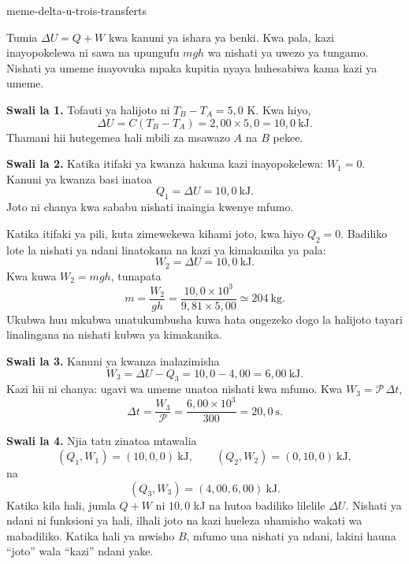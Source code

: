 \begin{exo}{meme-delta-u-trois-transferts}
\begin{indication}
Tumia $\Delta U=Q+W$ kwa kanuni ya ishara ya benki. Kwa pala, kazi inayopokelewa
ni sawa na upungufu $mgh$ wa nishati ya uwezo ya tungamo. Nishati ya umeme
inayovuka mpaka kupitia nyaya huhesabiwa kama kazi ya umeme.
\end{indication}

\begin{solution}
\textbf{Swali la 1.} Tofauti ya halijoto ni $T_B-T_A=5{,}0$ K. Kwa hiyo,
\[
\Delta U=C(T_B-T_A)
=2{,}00\times5{,}0
=10{,}0\ \mathrm{kJ}.
\]
Thamani hii hutegemea hali mbili za msawazo $A$ na $B$ pekee.

\textbf{Swali la 2.} Katika itifaki ya kwanza hakuna kazi inayopokelewa:
$W_1=0$. Kanuni ya kwanza basi inatoa
\[
Q_1=\Delta U=10{,}0\ \mathrm{kJ}.
\]
Joto ni chanya kwa sababu nishati inaingia kwenye mfumo.

Katika itifaki ya pili, kuta zimewekewa kihami joto, kwa hiyo $Q_2=0$.
Badiliko lote la nishati ya ndani linatokana na kazi ya kimakanika ya pala:
\[
W_2=\Delta U=10{,}0\ \mathrm{kJ}.
\]
Kwa kuwa $W_2=mgh$, tunapata
\[
m=\frac{W_2}{gh}
=\frac{10{,}0\times10^3}{9{,}81\times5{,}00}
\simeq 204\ \mathrm{kg}.
\]
Ukubwa huu mkubwa unatukumbusha kuwa hata ongezeko dogo la halijoto tayari
linalingana na nishati kubwa ya kimakanika.

\textbf{Swali la 3.} Kanuni ya kwanza inalazimisha
\[
W_3=\Delta U-Q_3=10{,}0-4{,}00=6{,}00\ \mathrm{kJ}.
\]
Kazi hii ni chanya: ugavi wa umeme unatoa nishati kwa mfumo. Kwa
$W_3=\mathcal P\,\Delta t$,
\[
\Delta t=\frac{W_3}{\mathcal P}
=\frac{6{,}00\times10^3}{300}
=20{,}0\ \mathrm{s}.
\]

\textbf{Swali la 4.} Njia tatu zinatoa mtawalia
\[
(Q_1,W_1)=(10{,}0,0)\ \mathrm{kJ},
\qquad
(Q_2,W_2)=(0,10{,}0)\ \mathrm{kJ},
\]
na
\[
(Q_3,W_3)=(4{,}00,6{,}00)\ \mathrm{kJ}.
\]
Katika kila hali, jumla $Q+W$ ni $10{,}0$ kJ na hutoa badiliko lilelile
$\Delta U$. Nishati ya ndani ni funksioni ya hali, ilhali joto na kazi
hueleza uhamisho wakati wa mabadiliko. Katika hali ya mwisho $B$, mfumo una
nishati ya ndani, lakini hauna “joto” wala “kazi” ndani yake.
\end{solution}
\end{exo}

